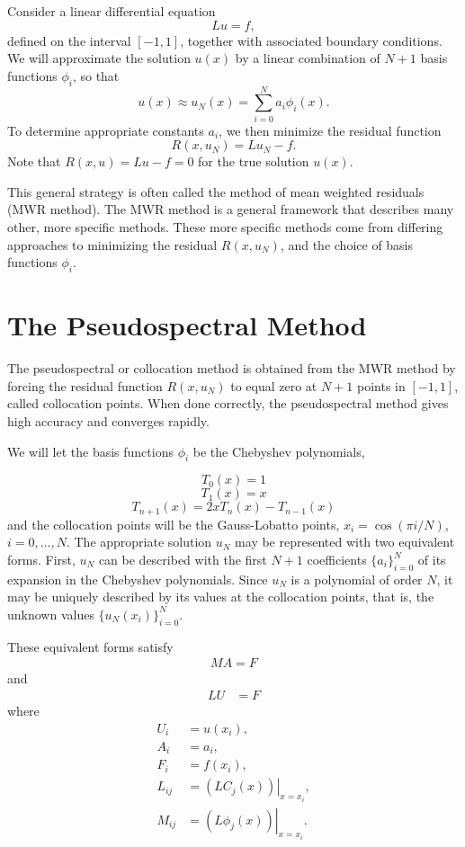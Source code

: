 \label{lab:pseudospectral1_revision}

Consider a linear differential equation
\[Lu = f, \]
defined on the interval $[-1,1]$, together with associated boundary conditions.
We will approximate the solution $u(x)$ by a linear combination of $N+1$ basis functions $\phi_i$, so that
\[
u(x) \approx u_N(x) = \sum_{i=0}^N a_i \phi_i(x).
\]
To determine appropriate constants $a_i$, we then minimize the residual function
\[
R(x,u_N) = Lu_N - f.
\]
Note that $R(x,u) = Lu - f = 0$ for the true solution $u(x)$.

This general strategy is often called the method of mean weighted residuals (MWR method). The MWR method is a general framework that describes many other, more specific methods. These more specific methods come from differing approaches to minimizing the residual $R(x,u_N)$, and the choice of basis functions $\phi_i$.


\section*{The Pseudospectral Method}
The pseudospectral or collocation method is obtained from the MWR method by forcing the residual function $R(x,u_N)$ to equal zero at $N+1$ points in $[-1,1]$, called collocation points.
When done correctly, the pseudospectral method gives high accuracy and converges rapidly.

We will let the basis functions $\phi_i$ be the Chebyshev polynomials, 

\[T_0(x)=1\]
\[T_1(x)=x\]
\[T_{n+1}(x)=2xT_n(x)-T_{n-1}(x)\]
and the collocation points will be the Gauss-Lobatto points, $x_i = \cos(\pi i /N)$, $ i = 0, \ldots, N$.
The appropriate solution $u_N$ may be represented with two equivalent forms.
First, $u_N$ can be described with the first $N+1$ coefficients  $\{a_i\}_{i=0}^N$ of its expansion in the Chebyshev polynomials.
Since $u_N$ is a polynomial of order $N$, it may be uniquely described by its values at the collocation points, that is, the unknown values  $\{u_N(x_i)\}_{i=0}^N$.

These equivalent forms satisfy
\begin{align}
	MA = F \label{spectral1b:chebychev_expansion}
\end{align}
and
\begin{align}
	LU &= F \label{spectral1b:grid_point}
\end{align}
where
\begin{align*}
	U_i &= u(x_i),\\
	A_i &= a_i,\\
	F_i &= f(x_i),\\
	L_{ij} &= \left.(LC_j(x))\right|_{x=x_i},\\
	M_{ij} &= \left.(L\phi_j(x))\right|_{x=x_i}.
\end{align*}


